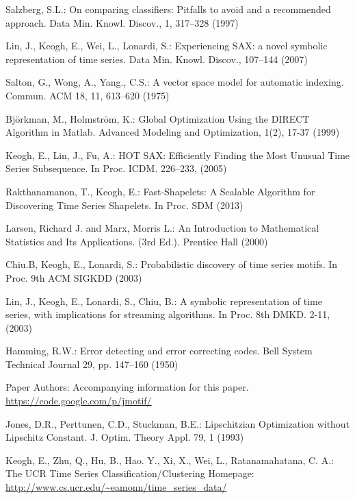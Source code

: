 \documentclass{llncs}
\begin{document}
\begin{thebibliography}{5}
Salzberg, S.L.:
On comparing classifiers: Pitfalls to avoid and a recommended approach. 
Data Min. Knowl. Discov., 1, 317--328 (1997)

Lin, J., Keogh, E., Wei, L., Lonardi, S.:
Experiencing SAX: a novel symbolic representation of time series.
Data Min. Knowl. Discov., 107--144 (2007)

Salton, G., Wong, A., Yang., C.S.:
A vector space model for automatic indexing. 
Commun. ACM 18, 11, 613--620 (1975)

Björkman, M., Holmström, K.:
Global Optimization Using the DIRECT Algorithm in Matlab.
Advanced Modeling and Optimization, 1(2), 17-37 (1999)

Keogh, E., Lin, J., Fu, A.:
HOT SAX: Efficiently Finding the Most Unusual Time Series Subsequence. 
In Proc. ICDM. 226--233, (2005)

Rakthanamanon, T., Keogh, E.:
Fast-Shapelets: A Scalable Algorithm for Discovering Time Series Shapelets.
In Proc. SDM (2013)

Larsen, Richard J. and Marx, Morris L.:
An Introduction to Mathematical Statistics and Its Applications. (3rd Ed.).
Prentice Hall (2000)


Chiu.B, Keogh, E., Lonardi, S.:
Probabilistic discovery of time series motifs. 
In Proc. 9th ACM SIGKDD (2003)

Lin, J., Keogh, E., Lonardi, S., Chiu, B.:
A symbolic representation of time series, with implications for streaming algorithms. 
In Proc. 8th DMKD. 2-11, (2003)

Hamming, R.W.:
Error detecting and error correcting codes. 
Bell System Technical Journal 29, pp. 147--160 (1950)

Paper Authors:
Accompanying information for this paper. 
\url{https://code.google.com/p/jmotif/}

Jones, D.R., Perttunen, C.D., Stuckman, B.E.:
Lipschitzian Optimization without Lipschitz Constant.
J. Optim. Theory Appl. 79, 1 (1993)

Keogh, E., Zhu, Q., Hu, B., Hao. Y.,  Xi, X., Wei, L., Ratanamahatana, C. A.:
The UCR Time Series Classification/Clustering Homepage:
\url{http://www.cs.ucr.edu/~eamonn/time_series_data/}


\end{thebibliography}
\end{document}
